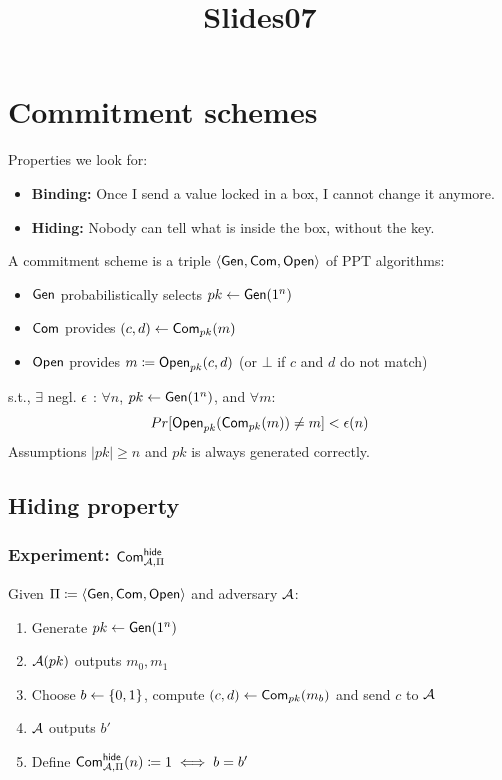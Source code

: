 \documentclass[12pt]{article}
\title{Slides07}
\begin{document}
\maketitle
\tableofcontents
\newpage


\section{Commitment schemes}
Properties we look for:
\begin{itemize}
\item \textbf{Binding:} Once I send a value locked in a box, I cannot change it anymore.
\item \textbf{Hiding:} Nobody can tell what is inside the box, without the key.
\end{itemize}

A commitment scheme is a triple $\langle \operatorname{\mathsf{Gen}}, \operatorname{\mathsf{Com}}, \operatorname{\mathsf{Open}} \rangle$ of PPT algorithms:
\begin{itemize}
\item $\operatorname{\mathsf{Gen}}$ probabilistically selects $pk \leftarrow \operatorname{\mathsf{Gen}}(1^n)$
\item $\operatorname{\mathsf{Com}}$ provides $(c,d) \leftarrow \operatorname{\mathsf{Com}}_{pk}(m)$
\item $\operatorname{\mathsf{Open}}$ provides $m \coloneqq \operatorname{\mathsf{Open}}_{pk}(c,d)$ (or $\bot$ if $c$ and $d$ do not match)
\end{itemize}
s.t., $\exists$ negl. $\epsilon$ : $\forall n$, $pk \leftarrow \operatorname{\mathsf{Gen}}(1^n)$, and $\forall m$:
\begin{equation*}
Pr[\operatorname{\mathsf{Open}}_{pk}(\operatorname{\mathsf{Com}}_{pk}(m)) \neq m] < \epsilon(n)
\end{equation*}
Assumptions $|pk| \ge n$ and $pk$ is always generated correctly.

\subsection{Hiding property}

\subsubsection{Experiment: $\operatorname{\mathsf{Com}}_{\mathcal{A},\Pi}^\mathsf{hide}$}
Given $\Pi \coloneqq \langle \operatorname{\mathsf{Gen}}, \operatorname{\mathsf{Com}}, \operatorname{\mathsf{Open}} \rangle$ and adversary $\mathcal{A}$:
\begin{enumerate}
	\item Generate $pk \leftarrow \operatorname{\mathsf{Gen}}(1^n)$
	\item $\mathcal{A}(pk)$ outputs $m_0,m_1$
	\item Choose $b \leftarrow \{0, 1\}$, compute $(c,d) \leftarrow \operatorname{\mathsf{Com}}_{pk}(m_b)$ and send $c$ to $\mathcal{A}$
	\item $\mathcal{A}$ outputs $b'$
	\item Define $\operatorname{\mathsf{Com}}_{\mathcal{A},\Pi}^\mathsf{hide}(n) \coloneqq 1 \iff b=b'$ 
\end{enumerate}
\end{document}
